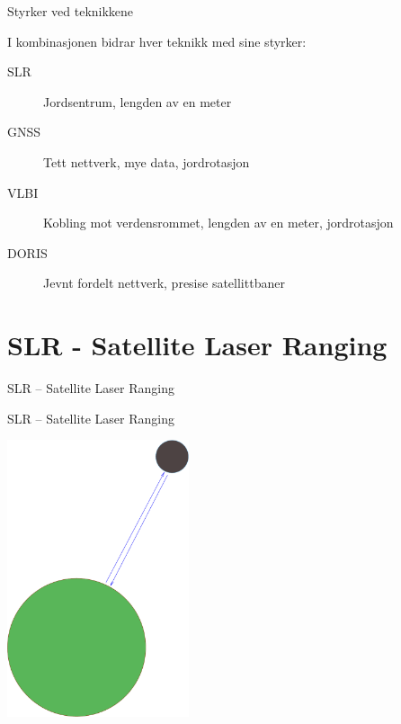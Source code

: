 \documentclass[12pt,table,t]{beamer}
\begin{document}
\begin{frame}{Styrker ved teknikkene}

  I kombinasjonen bidrar hver teknikk med sine styrker:

  \begin{description}
  \item[SLR] Jordsentrum, lengden av en meter
  \item[GNSS] Tett nettverk, mye data, jordrotasjon
  \item[VLBI] Kobling mot verdensrommet, lengden av en meter, jordrotasjon
  \item[DORIS] Jevnt fordelt nettverk, presise satellittbaner
  \end{description}
\end{frame}


\section{SLR - Satellite Laser Ranging}

\begin{frame}[c]{}
  \begin{center}
    {\Huge SLR -- Satellite Laser Ranging}
  \end{center}
\end{frame}


\begin{frame}{SLR -- Satellite Laser Ranging}

  \begin{center}
    \includegraphics[width=0.4\textwidth]{figure/lageos1}
  \end{center}
\end{frame}
\end{document}
